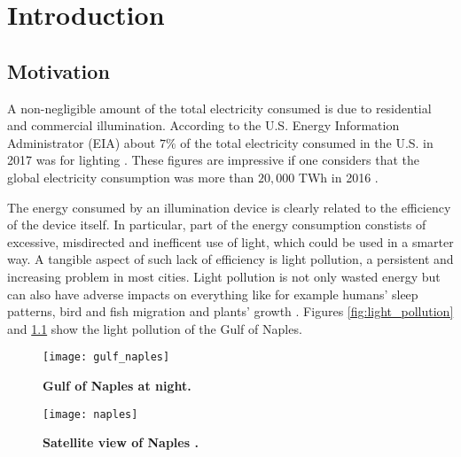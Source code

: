 \chapter{Introduction}
\section{Motivation}
A non-negligible amount of the total electricity consumed is due to residential and commercial illumination.
According to the U.S. Energy Information Administrator (EIA) about $7\%$ of the total electricity consumed in the U.S. in 2017 was for lighting \cite{electricity_light}. These figures are impressive if one considers that the global electricity consumption was more than $20,000$ TWh in 2016 \cite{statistic}. 

The energy consumed by an illumination device is clearly related to the efficiency of the device itself. 
In particular, part of the energy consumption constists of excessive, misdirected and inefficent use of light, which could be used in a smarter way. A tangible aspect of such lack of efficiency is light pollution, a persistent and increasing problem in most cities. Light pollution is not only wasted energy but can also have adverse impacts on everything like for example humans’ sleep patterns, bird and fish migration and plants’ growth \cite{bergesen2016potential}. Figures \ref{fig:light_pollution} and \ref{fig:light_pollution2} show the light pollution of the Gulf of Naples.
\begin{figure}[t]
  \begin{minipage}[t]{0.49\textwidth}
    \texttt{[image: gulf\_naples]}
    \caption{\textbf{Gulf of Naples at night.}}
    \label{fig:light_pollution}
\end{minipage}
\hfill
 \begin{minipage}[t]{ 0.49\textwidth}
    \texttt{[image: naples]}
    \caption{\textbf{Satellite view of Naples \cite{nasa_image}.}}
    \label{fig:light_pollution2}
\end{minipage}
  \end{figure}

